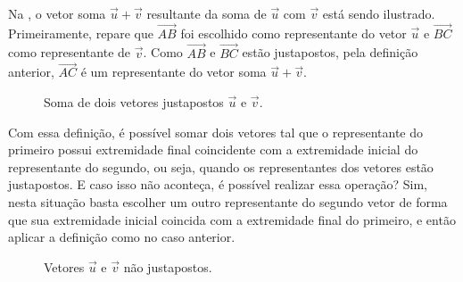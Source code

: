 Na , o vetor soma \(\vec{u}+\vec{v}\) resultante da soma de \(\vec{u}\) com \(\vec{v}\) está sendo ilustrado. Primeiramente, repare que \(\overrightarrow{AB}\) foi escolhido como representante do vetor \(\vec{u}\) e \(\overrightarrow{BC}\) como representante de \(\vec{v}\). Como \(\overrightarrow{AB}\) e \(\overrightarrow{BC}\) estão justapostos, pela definição anterior, \(\overrightarrow{AC}\) é um representante do vetor soma \(\vec{u}+\vec{v}\).
\begin{figure}[H]
\centering
{} 
 \caption{Soma de dois vetores justapostos $\vec{u}$ e $\vec{v}$.} \label{fig-geometria-operacoesvetores-08}
 \end{figure}
Com essa definição, é possível somar dois vetores tal que o representante do primeiro possui extremidade final coincidente com a extremidade inicial do representante do segundo, ou seja, quando os representantes dos vetores estão justapostos. E caso isso não aconteça, é possível realizar essa operação? Sim, nesta situação basta escolher um outro representante do segundo vetor de forma que sua extremidade inicial coincida com a extremidade final do primeiro, e então aplicar a definição como no caso anterior.
\begin{figure}[H]
\centering
{} 
 \caption{Vetores $\vec{u}$ e $\vec{v}$ não justapostos.} \label{fig-geometria-operacoesvetores-09}
 \end{figure}
